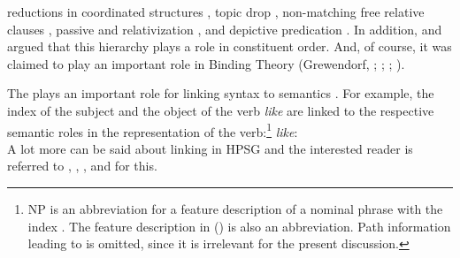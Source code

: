 \documentclass[output=paper
 	        ,biblatex
                ,babelshorthands
                ,newtxmath
                ,draftmode
                ,colorlinks, citecolor=brown
]{langscibook}
\begin{document}
reductions in coordinated structures \citep[]{Klein85},
topic drop \citep{Fries88b},
non-matching free relative clauses 
\parencites[Section~3]{Bausewein90}[]{Pittner95b}[--62]{Mueller99b}, 
passive and relativization \citep[, 68]{KC77a}, and
depictive predication \citep[Section~2]{Mueller2008a}.
In addition, \citet{Pullum77a} and \citet[]{ps} argued that this hierarchy plays a role in
constituent order.
And, of course, it was claimed to play an important role in Binding Theory 
(Grewendorf, \citeyear[]{Grewendorf83a}; \citeyear[]{Grewendorf85a}; \citeyear[]{Grewendorf88a}; \citealp[Chapter~6]{ps2}).

The \argstl plays an important role for linking syntax to semantics . For example, the index of the
subject and the object of the verb \emph{like} are linked to the respective semantic roles in the
representation of the verb:\footnote{%
  NP is an abbreviation for a feature description of a nominal phrase with the index . The feature description in () is also an
  abbreviation. Path information leading to \cont is omitted, since it is irrelevant for the present
  discussion.
%
}
\eas
\label{ex-like}
\emph{like}:\\
\zs 
A lot more can be said about linking in HPSG and the interested reader is referred to
, , , and  for this.
\end{document}
